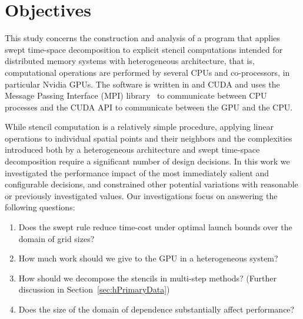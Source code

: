 \section{Objectives} \label{sec:obj1}

This study concerns the construction and analysis of a program that applies swept time-space decomposition to explicit stencil computations intended for distributed memory systems with heterogeneous architecture, that is, computational operations are performed by several CPUs and co-processors, in particular Nvidia GPUs.
The software is written in \CC{} and CUDA and uses the Message Passing Interface (MPI) library~\cite{Clarke1994} to communicate between CPU processes and the CUDA API to communicate between the GPU and the CPU.

While stencil computation is a relatively simple procedure, applying linear operations to individual spatial
points and their neighbors and the complexities introduced both by a heterogeneous architecture and swept
time-space decomposition require a significant number of design decisions.
In this work we investigated the performance impact of the most immediately salient and configurable decisions,
and constrained other potential variations with reasonable or previously investigated values.
Our investigations focus on answering the following questions:
\begin{enumerate}
    \item Does the swept rule reduce time-cost under optimal launch bounds over the domain of grid sizes?
    \item How much work should we give to the GPU in a heterogeneous system?
    \item How should we decompose the stencils in multi-step methods? (Further discussion in Section~\ref{sec:hPrimaryData})
    \item Does the size of the domain of dependence substantially affect performance?
\end{enumerate}
